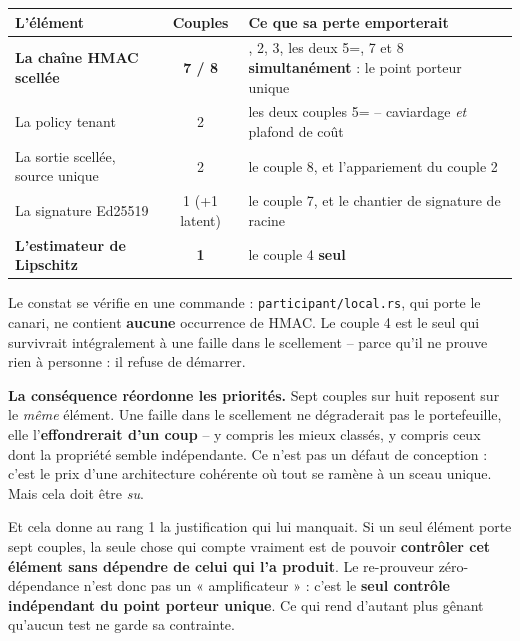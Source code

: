 \documentclass[10pt]{article}
\newcommand{\best}[1]{{\color{green}\textbf{#1}}}
\newcommand{\pire}[1]{{\color{red}\textbf{#1}}}
\newcommand{\sz}[1]{{\small\color{grey}\textsf{#1}}}
\newcommand{\code}[1]{\texttt{\small #1}}
\begin{document}
\renewcommand{\arraystretch}{1.15}
\begin{center}\small
\begin{tabular}{@{}>{\raggedright\arraybackslash}p{4.9cm} c >{\raggedright\arraybackslash}p{9.7cm}@{}}
\toprule
\textbf{L'élément} & \textbf{Couples} & \textbf{Ce que sa perte emporterait} \\
\midrule
\textbf{La chaîne HMAC scellée} & \pire{7 / 8} &
  1, 2, 3, les deux 5=, 7 et 8 \textbf{simultanément} : le point porteur unique \\
La policy tenant & 2 & les deux couples 5= -- caviardage \emph{et} plafond de coût \\
La sortie scellée, source unique & 2 & le couple 8, et l'appariement du couple 2 \\
La signature Ed25519 & 1 \sz{(+1 latent)} & le couple 7, et le chantier de signature de racine \\
\midrule
\textbf{L'estimateur de Lipschitz} & \best{1} & le couple 4 \textbf{seul} \\
\bottomrule
\end{tabular}
\end{center}

Le constat se vérifie en une commande : \code{participant/local.rs}, qui porte le canari, ne contient
\textbf{aucune} occurrence de HMAC. Le couple 4 est le seul qui survivrait intégralement à une faille
dans le scellement -- parce qu'il ne prouve rien à personne : il refuse de démarrer.

\begin{alerte}
\textbf{La conséquence réordonne les priorités.} Sept couples sur huit reposent sur le \emph{même}
élément. Une faille dans le scellement ne dégraderait pas le portefeuille, elle l'\textbf{effondrerait
d'un coup} -- y compris les mieux classés, y compris ceux dont la propriété semble indépendante. Ce
n'est pas un défaut de conception : c'est le prix d'une architecture cohérente où tout se ramène à un
sceau unique. Mais cela doit être \emph{su}.
\end{alerte}

Et cela donne au rang 1 la justification qui lui manquait. Si un seul élément porte sept couples, la
seule chose qui compte vraiment est de pouvoir \textbf{contrôler cet élément sans dépendre de celui qui
l'a produit}. Le re-prouveur zéro-dépendance n'est donc pas un « amplificateur » : c'est le
\textbf{seul contrôle indépendant du point porteur unique}. Ce qui rend d'autant plus gênant qu'aucun
test ne garde sa contrainte.
\end{document}

